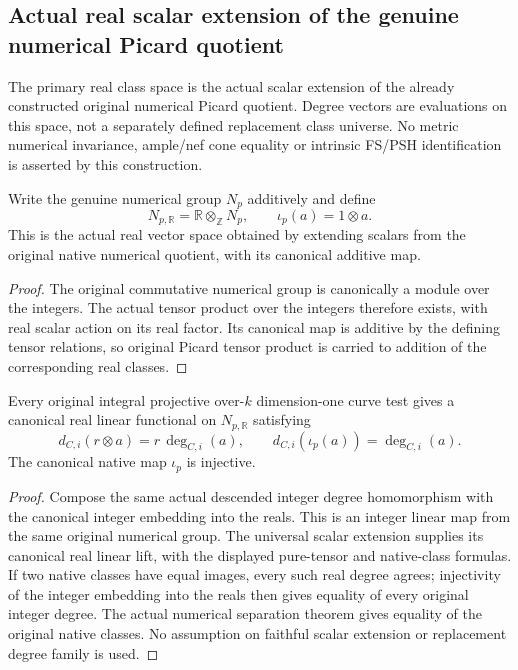 \subsection{Actual real scalar extension of the genuine numerical Picard quotient}
The primary real class space is the actual scalar extension of the
already constructed original numerical Picard quotient. Degree vectors
are evaluations on this space, not a separately defined replacement
class universe. No metric numerical invariance, ample/nef cone equality
or intrinsic FS/PSH identification is asserted by this construction.

\begin{definition}
\label{def:seven-native-real-numerical-classes}
\leanok
{}
Write the genuine numerical group $N_p$ additively and define
\[
 N_{p,\mathbb R}=\mathbb R\otimes_{\mathbb Z}N_p,
 \qquad \iota_p(a)=1\otimes a.
\]
This is the actual real vector space obtained by extending scalars from
the original native numerical quotient, with its canonical additive map.
\end{definition}
\begin{proof}
The original commutative numerical group is canonically a module over
the integers. The actual tensor product over the integers therefore
exists, with real scalar action on its real factor. Its canonical map
is additive by the defining tensor relations, so original Picard tensor
product is carried to addition of the corresponding real classes.
\end{proof}

\begin{theorem}
\label{thm:seven-native-real-curve-degrees}
\leanok
{}
Every original integral projective over-$k$ dimension-one curve test
gives a canonical real linear functional on $N_{p,\mathbb R}$ satisfying
\[
 d_{C,i}(r\otimes a)=r\,\deg_{C,i}(a),\qquad
 d_{C,i}(\iota_p(a))=\deg_{C,i}(a).
\]
The canonical native map $\iota_p$ is injective.
\end{theorem}
\begin{proof}
Compose the same actual descended integer degree homomorphism with the
canonical integer embedding into the reals. This is an integer linear
map from the same original numerical group. The universal scalar
extension supplies its canonical real linear lift, with the displayed
pure-tensor and native-class formulas. If two native classes have equal
images, every such real degree agrees; injectivity of the integer
embedding into the reals then gives equality of every original integer
degree. The actual numerical separation theorem gives equality of the
original native classes. No assumption on faithful scalar extension or
replacement degree family is used.
\end{proof}


